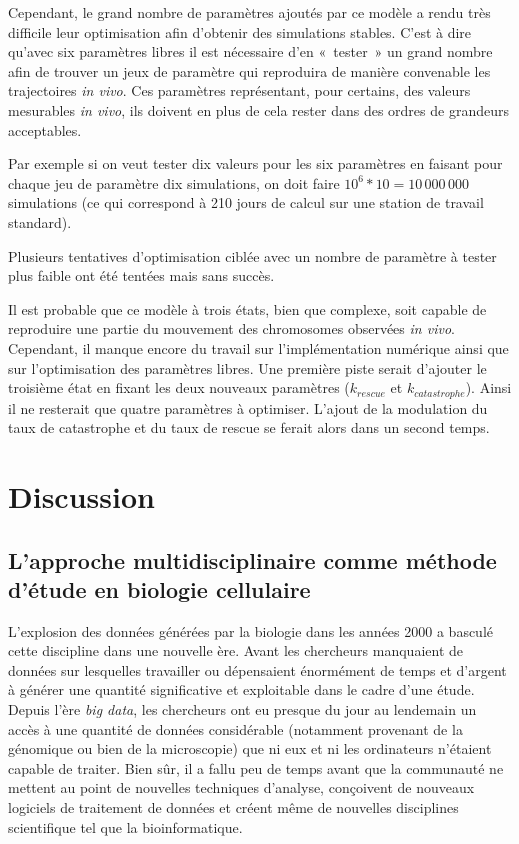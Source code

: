 \documentclass[12pt,a4paper,twoside,openright]{book}
\begin{document}
Cependant, le grand nombre de paramètres ajoutés par ce modèle a rendu
très difficile leur optimisation afin d'obtenir des simulations stables.
C'est à dire qu'avec six paramètres libres il est nécessaire d'en
«~tester~» un grand nombre afin de trouver un jeux de paramètre qui
reproduira de manière convenable les trajectoires \emph{in vivo}. Ces
paramètres représentant, pour certains, des valeurs mesurables \emph{in
vivo}, ils doivent en plus de cela rester dans des ordres de grandeurs
acceptables.

Par exemple si on veut tester dix valeurs pour les six paramètres en
faisant pour chaque jeu de paramètre dix simulations, on doit faire
\(10^6 * 10 = 10\,000\,000\) simulations (ce qui correspond à 210 jours
de calcul sur une station de travail standard).

Plusieurs tentatives d'optimisation ciblée avec un nombre de paramètre à
tester plus faible ont été tentées mais sans succès.

Il est probable que ce modèle à trois états, bien que complexe, soit
capable de reproduire une partie du mouvement des chromosomes observées
\emph{in vivo}. Cependant, il manque encore du travail sur
l'implémentation numérique ainsi que sur l'optimisation des paramètres
libres. Une première piste serait d'ajouter le troisième état en fixant
les deux nouveaux paramètres (\(k_{rescue}\) et \(k_{catastrophe}\)).
Ainsi il ne resterait que quatre paramètres à optimiser. L'ajout de la
modulation du taux de catastrophe et du taux de rescue se ferait alors
dans un second temps.

\clearpage\null

\chapter{Discussion}\label{discussion}

\section{L'approche multidisciplinaire comme méthode d'étude en biologie
cellulaire}\label{lapproche-multidisciplinaire-comme-muxe9thode-duxe9tude-en-biologie-cellulaire}

L'explosion des données générées par la biologie dans les années 2000 a
basculé cette discipline dans une nouvelle ère. Avant les chercheurs
manquaient de données sur lesquelles travailler ou dépensaient
énormément de temps et d'argent à générer une quantité significative et
exploitable dans le cadre d'une étude. Depuis l'ère \emph{big data}, les
chercheurs ont eu presque du jour au lendemain un accès à une quantité
de données considérable (notamment provenant de la génomique ou bien de
la microscopie) que ni eux et ni les ordinateurs n'étaient capable de
traiter. Bien sûr, il a fallu peu de temps avant que la communauté ne
mettent au point de nouvelles techniques d'analyse, conçoivent de
nouveaux logiciels de traitement de données et créent même de nouvelles
disciplines scientifique tel que la bioinformatique.
\end{document}
